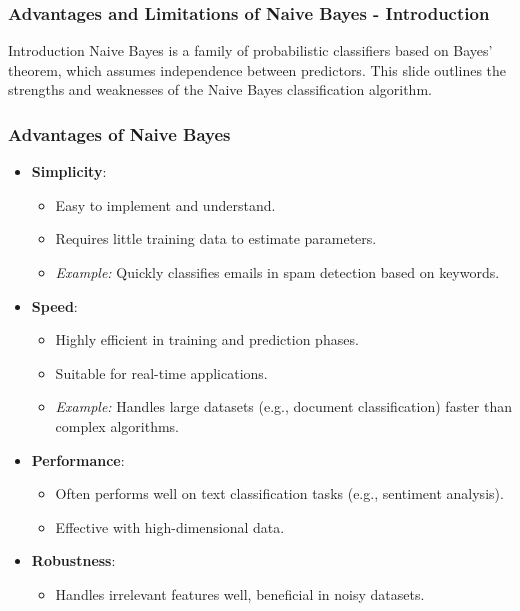 \documentclass[aspectratio=169]{beamer}
\begin{document}
\begin{frame}[fragile]
    \frametitle{Advantages and Limitations of Naive Bayes - Introduction}
    \begin{block}{Introduction}
        Naive Bayes is a family of probabilistic classifiers based on Bayes' theorem, which assumes independence between predictors. This slide outlines the strengths and weaknesses of the Naive Bayes classification algorithm.
    \end{block}
\end{frame}

\begin{frame}[fragile]
    \frametitle{Advantages of Naive Bayes}
    \begin{itemize}
        \item \textbf{Simplicity}:
        \begin{itemize}
            \item Easy to implement and understand.
            \item Requires little training data to estimate parameters.
            \item \textit{Example:} Quickly classifies emails in spam detection based on keywords.
        \end{itemize}

        \item \textbf{Speed}:
        \begin{itemize}
            \item Highly efficient in training and prediction phases.
            \item Suitable for real-time applications.
            \item \textit{Example:} Handles large datasets (e.g., document classification) faster than complex algorithms.
        \end{itemize}

        \item \textbf{Performance}:
        \begin{itemize}
            \item Often performs well on text classification tasks (e.g., sentiment analysis).
            \item Effective with high-dimensional data.
        \end{itemize}

        \item \textbf{Robustness}:
        \begin{itemize}
            \item Handles irrelevant features well, beneficial in noisy datasets.
        \end{itemize}
    \end{itemize}
\end{frame}
\end{document}
